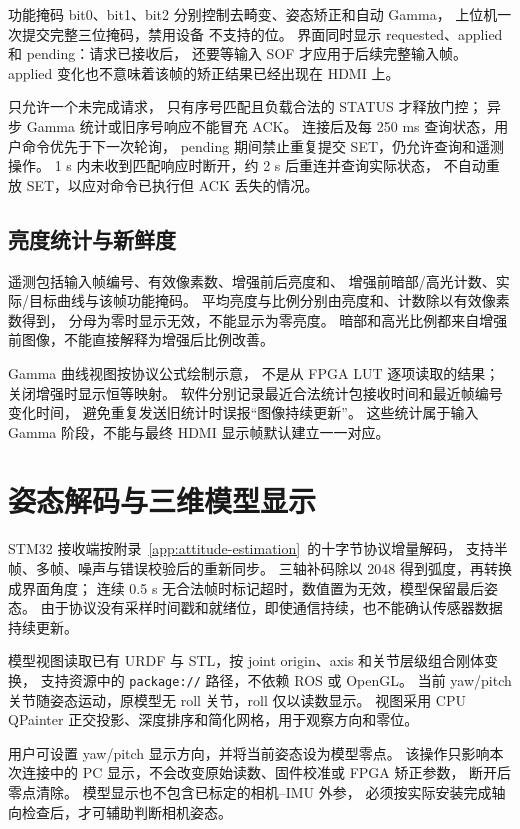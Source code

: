功能掩码 bit0、bit1、bit2 分别控制去畸变、姿态矫正和自动 Gamma，
上位机一次提交完整三位掩码，禁用设备  不支持的位。
界面同时显示 requested、applied 和 pending：请求已接收后，
还要等输入 SOF 才应用于后续完整输入帧。
applied 变化也不意味着该帧的矫正结果已经出现在 HDMI 上。

 只允许一个未完成请求，
只有序号匹配且负载合法的 STATUS 才释放门控；
异步 Gamma 统计或旧序号响应不能冒充 ACK。
连接后及每 250 ms 查询状态，用户命令优先于下一次轮询，
pending 期间禁止重复提交 SET，仍允许查询和遥测操作。
1 s 内未收到匹配响应时断开，约 2 s 后重连并查询实际状态，
不自动重放 SET，以应对命令已执行但 ACK 丢失的情况。

\subsection{亮度统计与新鲜度}
遥测包括输入帧编号、有效像素数、增强前后亮度和、
增强前暗部/高光计数、实际/目标曲线与该帧功能掩码。
平均亮度与比例分别由亮度和、计数除以有效像素数得到，
分母为零时显示无效，不能显示为零亮度。
暗部和高光比例都来自增强前图像，不能直接解释为增强后比例改善。

Gamma 曲线视图按协议公式绘制示意，
不是从 FPGA LUT 逐项读取的结果；关闭增强时显示恒等映射。
软件分别记录最近合法统计包接收时间和最近帧编号变化时间，
避免重复发送旧统计时误报“图像持续更新”。
这些统计属于输入 Gamma 阶段，不能与最终 HDMI 显示帧默认建立一一对应。

\section{姿态解码与三维模型显示}
STM32 接收端按附录~\ref{app:attitude-estimation}~的十字节协议增量解码，
支持半帧、多帧、噪声与错误校验后的重新同步。
三轴补码除以 2048 得到弧度，再转换成界面角度；
连续 0.5 s 无合法帧时标记超时，数值置为无效，模型保留最后姿态。
由于协议没有采样时间戳和就绪位，即使通信持续，也不能确认传感器数据持续更新。

模型视图读取已有 URDF 与 STL，按 joint origin、axis 和关节层级组合刚体变换，
支持资源中的 \texttt{package://} 路径，不依赖 ROS 或 OpenGL。
当前 yaw/pitch 关节随姿态运动，原模型无 roll 关节，roll 仅以读数显示。
视图采用 CPU QPainter 正交投影、深度排序和简化网格，用于观察方向和零位。

用户可设置 yaw/pitch 显示方向，并将当前姿态设为模型零点。
该操作只影响本次连接中的 PC 显示，不会改变原始读数、固件校准或 FPGA 矫正参数，
断开后零点清除。
模型显示也不包含已标定的相机--IMU 外参，
必须按实际安装完成轴向检查后，才可辅助判断相机姿态。

